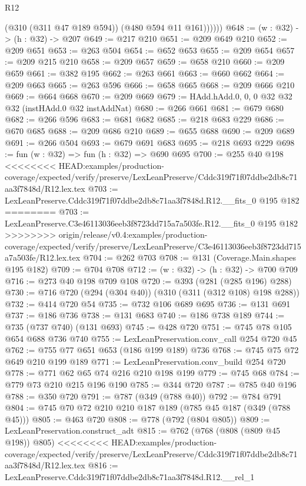 \begin{lexlean}{R12}
\begin{coremodule}
{{{{{{{{              (@310 (@311 @47 @189 @594))
              (@480 @594 @11 @161))))))
@648 := (w : @32) -> (h : @32) -> @207
@649 := @217 @210
@651 := @209 @649 @210
@652 := @209 @651
@653 := @263 @504
@654 := @652 @653
@655 := @209 @654
@657 := @209 @215 @210
@658 := @209 @657
@659 := @658 @210
@660 := @209 @659
@661 := @382 @195
@662 := @263 @661
@663 := @660 @662
@664 := @209 @663
@665 := @263 @596
@666 := @658 @665
@668 := @209 @666 @210
@669 := @664 @668
@670 := @209 @669
@679 := HAdd.hAdd.{0, 0, 0} @32 @32 @32 (instHAdd.{0} @32 instAddNat)
@680 := @266 @661
@681 := @679 @680
@682 := @266 @596
@683 := @681 @682
@685 := @218 @683 @229
@686 := @670 @685
@688 := @209 @686 @210
@689 := @655 @688
@690 := @209 @689
@691 := @266 @504
@693 := @679 @691 @683
@695 := @218 @693 @229
@698 := fun (w : @32) => fun (h : @32) => @690 @695
@700 := @255 @40 @198
<<<<<<<< HEAD:examples/production-coverage/expected/verify/preserve/LexLeanPreserve/Cddc319f71f07ddbe2db8c71aa3f7848d/R12.lex.tex
@703 := LexLeanPreserve.Cddc319f71f07ddbe2db8c71aa3f7848d.R12.__fits_0 @195 @182
========
@703 := LexLeanPreserve.C3e46113036eeb3f8723dd715a7a503fe.R12.__fits_0 @195 @182
>>>>>>>> origin/release/v0.4:examples/production-coverage/expected/verify/preserve/LexLeanPreserve/C3e46113036eeb3f8723dd715a7a503fe/R12.lex.tex
@704 := @262 @703
@708 := @131 (Coverage.Main.shapes @195 @182)
@709 := @704 @708
@712 := (w : @32) -> (h : @32) -> @700 @709
@716 := @273 @40 @198 @709 @108
@720 := @393 (@281 (@285 @196) @288)
@730 := @716 @720 (@294 (@304 @40)) (@310 (@311 (@312 @108) @198 @288))
@732 := @414 @720 @54
@735 := @732 @106 @689 @695
@736 := @131 @691
@737 := @186 @736
@738 := @131 @683
@740 := @186 @738 @189
@744 := @735 (@737 @740) (@131 @693)
@745 := @428 @720
@751 := @745 @78 @105 @654 @688 @736 @740
@755 := LexLeanPreservation.conv_call @254 @720 @45
@762 := @755 @77 @651 @653 (@186 @199 @189) @736
@768 := @745 @75 @72 @649 @210 @199 @189
@771 := LexLeanPreservation.conv_build @254 @720
@778 := @771 @62 @65 @74 @216 @210 @198 @199
@779 := @745 @68
@784 := @779 @73 @210 @215 @196 @190
@785 := @344 @720
@787 := @785 @40 @196
@788 := @350 @720
@791 := @787 (@349 (@788 @40))
@792 := @784 @791
@804 := @745 @70 @72 @210 @210 @187 @189 (@785 @45 @187 (@349 (@788 @45)))
@805 := @463 @720
@808 := @778 (@792 (@804 @805))
@809 := LexLeanPreservation.construct_adt
@815 := @762 (@768 (@808 (@809 @45 @198)) @805)
<<<<<<<< HEAD:examples/production-coverage/expected/verify/preserve/LexLeanPreserve/Cddc319f71f07ddbe2db8c71aa3f7848d/R12.lex.tex
@816 := LexLeanPreserve.Cddc319f71f07ddbe2db8c71aa3f7848d.R12.__rel_1
}}}}}}}}
\end{coremodule}
\end{lexlean}
